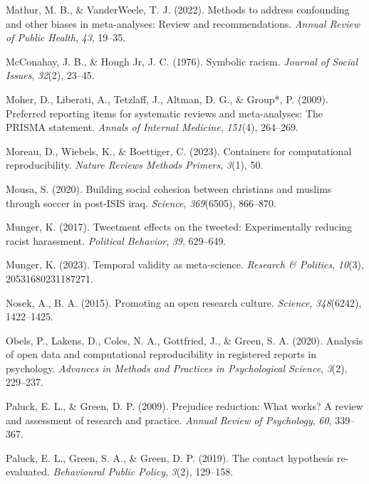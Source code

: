 \documentclass[
  ,jou]{apa6}
\newlength{\cslhangindent}
\newenvironment{CSLReferences}[2] %
 {\begin{list}{}{%
  \setlength{\itemindent}{0pt}
  \setlength{\leftmargin}{0pt}
  \setlength{\parsep}{0pt}
  \ifodd #1
   \setlength{\leftmargin}{\cslhangindent}
   \setlength{\itemindent}{-1\cslhangindent}
  \fi
  \setlength{\itemsep}{#2\baselineskip}}}
 {\end{list}}
\begin{document}
\begin{CSLReferences}{1}{0}
Mathur, M. B., \& VanderWeele, T. J. (2022). Methods to address confounding and other biases in meta-analyses: Review and recommendations. \emph{Annual Review of Public Health}, \emph{43}, 19--35.

McConahay, J. B., \& Hough Jr, J. C. (1976). Symbolic racism. \emph{Journal of Social Issues}, \emph{32}(2), 23--45.

Moher, D., Liberati, A., Tetzlaff, J., Altman, D. G., \& Group*, P. (2009). Preferred reporting items for systematic reviews and meta-analyses: The PRISMA statement. \emph{Annals of Internal Medicine}, \emph{151}(4), 264--269.

Moreau, D., Wiebels, K., \& Boettiger, C. (2023). Containers for computational reproducibility. \emph{Nature Reviews Methods Primers}, \emph{3}(1), 50.

Mousa, S. (2020). Building social cohesion between christians and muslims through soccer in post-ISIS iraq. \emph{Science}, \emph{369}(6505), 866--870.

Munger, K. (2017). Tweetment effects on the tweeted: Experimentally reducing racist harassment. \emph{Political Behavior}, \emph{39}, 629--649.

Munger, K. (2023). Temporal validity as meta-science. \emph{Research \& Politics}, \emph{10}(3), 20531680231187271.

Nosek, A., B. A. (2015). Promoting an open research culture. \emph{Science}, \emph{348}(6242), 1422--1425.

Obels, P., Lakens, D., Coles, N. A., Gottfried, J., \& Green, S. A. (2020). Analysis of open data and computational reproducibility in registered reports in psychology. \emph{Advances in Methods and Practices in Psychological Science}, \emph{3}(2), 229--237.

Paluck, E. L., \& Green, D. P. (2009). Prejudice reduction: What works? A review and assessment of research and practice. \emph{Annual Review of Psychology}, \emph{60}, 339--367.

Paluck, E. L., Green, S. A., \& Green, D. P. (2019). The contact hypothesis re-evaluated. \emph{Behavioural Public Policy}, \emph{3}(2), 129--158.


\end{CSLReferences}
\end{document}
